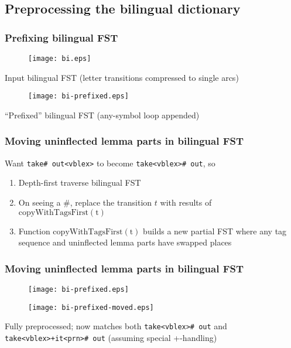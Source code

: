\documentclass[notes=hide]{beamer}
\newcommand{\ana}[1]{\texttt{#1}}
\newcommand{\fn}[1]{$\mathrm{#1}$}
\begin{document}
\subsection{Preprocessing the bilingual dictionary}
\begin{frame}
  \frametitle{Prefixing bilingual FST}
  \begin{center}
    \begin{figure}[h]
      \texttt{[image: bi.eps]}
    \end{figure}
    \scriptsize{Input bilingual FST (letter transitions compressed to single arcs)}
    \begin{figure}[h]
      \texttt{[image: bi-prefixed.eps]}
    \end{figure}
    \scriptsize{``Prefixed'' bilingual FST (any-symbol loop appended)}
  \end{center}
\end{frame}

\begin{frame}
  \frametitle{Moving uninflected lemma parts in bilingual FST}
  Want \ana{take\# out<vblex>} to become \ana{take<vblex>\# out}, so 
  \begin{enumerate}
  \item Depth-first traverse bilingual FST
  \item On seeing a \#, replace the transition $t$ with results of \fn{copyWithTagsFirst(t)}
  \item Function \fn{copyWithTagsFirst(t)} builds a new partial FST
    where any tag sequence and uninflected lemma parts have swapped
    places
  \end{enumerate}
\end{frame}

\begin{frame}
  \frametitle{Moving uninflected lemma parts in bilingual FST}
  \begin{center}
    \begin{figure}[h]
      \texttt{[image: bi-prefixed.eps]}
    \end{figure}

    \begin{figure}[h]
      \texttt{[image: bi-prefixed-moved.eps]}
    \end{figure}
    \scriptsize{Fully preprocessed; now matches both \ana{take<vblex>\# out} and \ana{take<vblex>+it<prn>\# out} (assuming special +-handling) }
  \end{center}

\end{frame}
\end{document}
